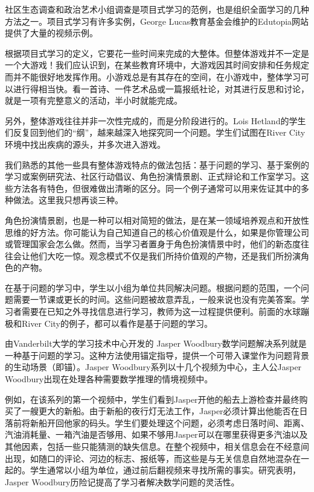 社区生态调查和政治艺术小组调查是项目式学习的范例，也是组织全面学习的几种方法之一。项目式学习有许多实例，George Lucas教育基金会维护的Edutopia网站提供了大量的视频示例。

根据项目式学习的定义，它要花一些时间来完成的大整体。但整体游戏并不一定是一个大游戏！我们应认识到，在某些教育环境中，大游戏因其时间安排和任务规定而并不能很好地发挥作用。小游戏总是有其存在的空间，在小游戏中，整体学习可以进行得相当快。看一首诗、一件艺术品或一篇报纸社论，对其进行反思和讨论，就是一项有完整意义的活动，半小时就能完成。

另外，整体游戏往往并非一次性完成的，而是分阶段进行的。Lois Hetland的学生们反复回到他们的“纲”，越来越深入地探究同一个问题。学生们试图在River City环境中找出疾病的源头，并多次进入游戏。

我们熟悉的其他一些具有整体游戏特点的做法包括：基于问题的学习、基于案例的学习或案例研究法、社区行动倡议、角色扮演情景剧、正式辩论和工作室学习。这些方法各有特色，但很难做出清晰的区分。同一个例子通常可以用来佐证其中的多种做法。这里我只想再谈三种。

角色扮演情景剧，也是一种可以相对简短的做法，是在某一领域培养观点和开放性思维的好方法。你可能认为自己知道自己的核心价值观是什么，如果是你管理公司或管理国家会怎么做。然而，当学习者置身于角色扮演情景中时，他们的新态度往往会让他们大吃一惊。观念模式不仅是我们所持价值观的产物，还是我们所扮演角色的产物。

在基于问题的学习中，学生以小组为单位共同解决问题。根据问题的范围，一个问题需要一节课或更长的时间。这些问题被故意弄乱，一般来说也没有完美答案。学习者需要在已知之外寻找信息进行学习，教师为这一过程提供便利。前面的水球蹦极和River City的例子，都可以看作是基于问题的学习。

由Vanderbilt大学的学习技术中心开发的 Jasper Woodbury数学问题解决系列就是一种基于问题的学习。这种方法使用锚定指导，提供一个可带入课堂作为问题背景的生动场景（即锚）。Jasper Woodbury系列以十几个视频为中心，主人公Jasper Woodbury出现在处理各种需要数学推理的情境视频中。

例如，在该系列的第一个视频中，学生们看到Jasper开他的船去上游检查并最终购买了一艘更大的新船。由于新船的夜行灯无法工作，Jasper必须计算出他能否在日落前将新船开回他家的码头。学生们要处理这个问题，必须考虑日落时间、距离、汽油消耗量、一箱汽油是否够用、如果不够用Jasper可以在哪里获得更多汽油以及其他因素，包括一些只能猜测的缺失信息。在整个视频中，相关信息会在不经意间出现，如随口的评论、河边的标志、报纸等，而这些是与无关信息自然地混杂在一起的。学生通常以小组为单位，通过前后翻视频来寻找所需的事实。研究表明，Jasper Woodbury历险记提高了学习者解决数学问题的灵活性。

